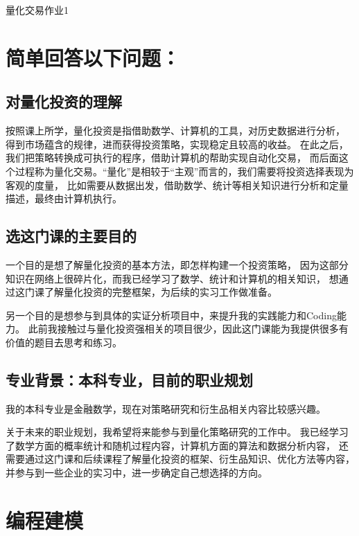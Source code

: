 \documentclass[a4paper,12pt]{article}
\title{}
\author{}
\date{}
\begin{document}
\begin{center}
{\heiti 量化交易作业1}
\end{center}

\section{简单回答以下问题：}

\subsection{对量化投资的理解}

按照课上所学，量化投资是指借助数学、计算机的工具，对历史数据进行分析，
得到市场蕴含的规律，进而获得投资策略，实现稳定且较高的收益。
在此之后，我们把策略转换成可执行的程序，借助计算机的帮助实现自动化交易，
而后面这个过程称为量化交易。“量化”是相较于“主观”而言的，我们需要将投资选择表现为客观的度量，
比如需要从数据出发，借助数学、统计等相关知识进行分析和定量描述，最终由计算机执行。

\subsection{选这门课的主要目的}

一个目的是想了解量化投资的基本方法，即怎样构建一个投资策略，
因为这部分知识在网络上很碎片化，而我已经学习了数学、统计和计算机的相关知识，
想通过这门课了解量化投资的完整框架，为后续的实习工作做准备。

另一个目的是想参与到具体的实证分析项目中，来提升我的实践能力和Coding能力。
此前我接触过与量化投资强相关的项目很少，因此这门课能为我提供很多有价值的题目去思考和练习。

\subsection{专业背景：本科专业，目前的职业规划}

我的本科专业是金融数学，现在对策略研究和衍生品相关内容比较感兴趣。

关于未来的职业规划，我希望将来能参与到量化策略研究的工作中。
我已经学习了数学方面的概率统计和随机过程内容，计算机方面的算法和数据分析内容，
还需要通过这门课和后续课程了解量化投资的框架、衍生品知识、优化方法等内容，
并参与到一些企业的实习中，进一步确定自己想选择的方向。


\section{编程建模}
\end{document}
